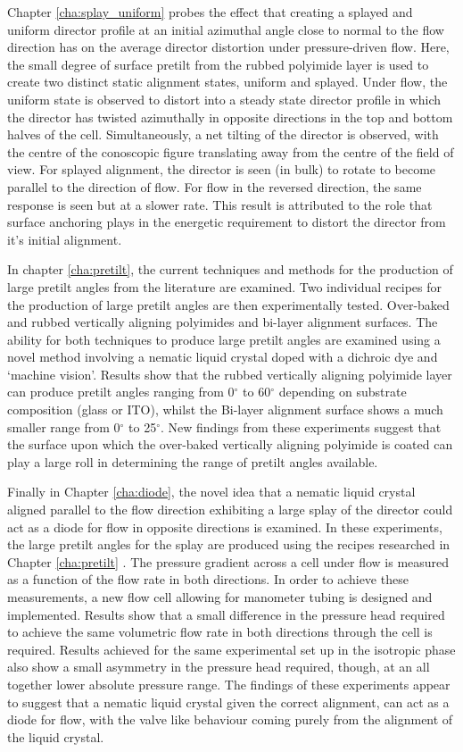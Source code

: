Chapter \ref{cha:splay_uniform} probes the effect that creating a splayed and uniform director profile at an initial azimuthal angle close to normal to the flow direction has on the average director distortion under pressure-driven flow. Here, the small degree of surface pretilt from the rubbed polyimide layer is used to create two distinct static alignment states, uniform and splayed. Under flow, the uniform state is observed to distort into a steady state director profile in which the director has twisted azimuthally in opposite directions in the top and bottom halves of the cell. Simultaneously, a net tilting of the director is observed, with the centre of the conoscopic figure translating away from the centre of the field of view. For splayed alignment, the director is seen (in bulk) to rotate to become parallel to the direction of flow. For flow in the reversed direction, the same response is seen but at a slower rate. This result is attributed to the role that surface anchoring plays in the energetic requirement to distort the director from it's initial alignment.

In chapter \ref{cha:pretilt}, the current techniques and methods for the production of large pretilt angles from the literature are examined. Two individual recipes for the production of large pretilt angles are then experimentally tested. Over-baked and rubbed vertically aligning polyimides and bi-layer alignment surfaces. The ability for both techniques to produce large pretilt angles are examined using a novel method involving a nematic liquid crystal doped with a dichroic dye and `machine vision'. Results show that the rubbed vertically aligning polyimide layer can produce pretilt angles ranging from 0$^{\circ}$ to 60$^{\circ}$ depending on substrate composition (glass or ITO), whilst the Bi-layer alignment surface shows a much smaller range from 0$^{\circ}$ to 25$^{\circ}$. New findings from these experiments suggest that the surface upon which the over-baked vertically aligning polyimide is coated can play a large roll in determining the range of pretilt angles available.

Finally in Chapter \ref{cha:diode}, the novel idea that a nematic liquid crystal aligned parallel to the flow direction exhibiting a large splay of the director could act as a diode for flow in opposite directions is examined. In these experiments, the large pretilt angles for the splay are produced using the recipes researched in Chapter \ref{cha:pretilt} . The pressure gradient across a cell under flow is measured as a function of the flow rate in both directions. In order to achieve these measurements, a new flow cell allowing for manometer tubing is designed and implemented. Results show that a small difference in the pressure head required to achieve the same volumetric flow rate in both directions through the cell is required. Results achieved for the same experimental set up in the isotropic phase also show a small asymmetry in the pressure head required, though, at an all together lower absolute pressure range. The findings of these experiments appear to suggest that a nematic liquid crystal given the correct alignment, can act as a diode for flow, with the valve like behaviour coming purely from the alignment of the liquid crystal.

